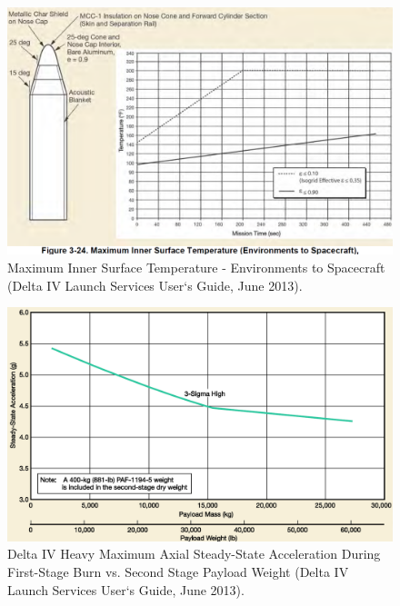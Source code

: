 \begin{figure}[htb]
\centering
\includegraphics[scale=0.3]{figures/Orbiter/shell_temp.png}
\caption{Maximum Inner Surface Temperature - Environments to Spacecraft (Delta IV Launch Services User‘s Guide, June 2013).\cite{Atlasm}}
\end{figure}

\begin{figure}[htb]
\centering
\includegraphics[scale=0.3]{figures/Orbiter/g_staging.png}
\caption{Delta IV Heavy Maximum Axial Steady-State Acceleration During First-Stage Burn vs. Second Stage Payload Weight (Delta IV Launch Services User‘s Guide, June 2013).\cite{Atlasm}}
\label{fig:gloads}
\end{figure}

